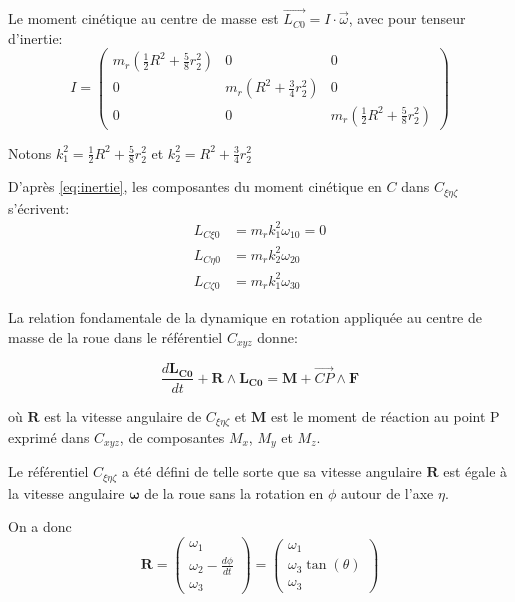 Le moment cinétique au centre de masse est $\vec{L_{C0}}=I \cdot \vec{\omega}$, avec pour tenseur d'inertie:
\begin{equation}
    I=
\begin{pmatrix}
   m_r (\frac{1}{2}R^2+\frac{5}{8}r_2^2) & 0  &  0 \\
  0 &  m_r(R^2+\frac{3}{4}r_2^2) & 0 \\
  0 & 0 & m_r (\frac{1}{2}R^2+\frac{5}{8}r_2^2)
\end{pmatrix}
\label{eq:inertie}
\end{equation}


Notons $k_1^2=\frac{1}{2}R^2+\frac{5}{8}r_2^2$ et $k_2^2=R^2+\frac{3}{4}r_2^2$

D'après \ref{eq:inertie}, les composantes du moment cinétique en $C$ dans $C_{\xi \eta \zeta}$ s'écrivent:
\begin{align}
    L_{C\xi0 }&=m_r k_1^2 \omega_{10}=0 \nonumber\\
    L_{C\eta0}&=m_r k_2^2 \omega_{20} \nonumber\\
    L_{C\zeta0 }&=m_r k_1^2 \omega_{30}
  \label{eq:b6}
\end{align}

La relation fondamentale de la dynamique en rotation appliquée au centre de masse de la roue dans le référentiel $C_{xyz}$ donne:

\begin{equation}
    \frac{d \mathbf{L_{C0}}}{dt} + \mathbf{R} \wedge \mathbf{L_{C0}} = \mathbf{M}+ \overrightarrow{CP} \wedge \mathbf{F} 
\label{eq:rfdr}
\end{equation}

où $\mathbf{R}$ est la vitesse angulaire de $C_{\xi \eta \zeta}$ et $\mathbf{M}$ est le moment de réaction au point P exprimé dans $C_{xyz}$, de composantes $M_x$, $M_y$ et $M_z$.

Le référentiel $C_{\xi \eta \zeta}$ a été défini de telle sorte que sa vitesse angulaire $\mathbf{R}$ est égale à la vitesse angulaire $\mathbf{\omega}$ de la roue sans la rotation en $\phi$ autour de l'axe $\eta$.

On a donc
\begin{equation}
   \mathbf{R}= \begin{pmatrix}
    \omega_1  \\
    \omega_2 - \frac{d\phi}{dt} \\
    \omega_3     
\end{pmatrix} 
=
\begin{pmatrix}
    \omega_1  \\
    \omega_{3}\tan(\theta) \\
    \omega_3     
\end{pmatrix} 
\label{eq:rb}
\end{equation}

